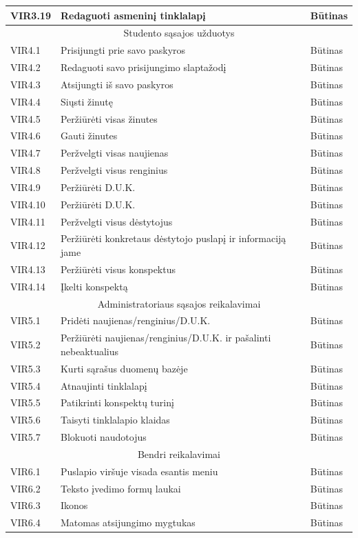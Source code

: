 \documentclass{VUMIFPSkursinis}
\begin{document}
\begin{longtable}{|p{2cm}|p{}|p{2cm}|}
{VIR3.19}&{Redaguoti asmeninį tinklalapį}&{Būtinas}\\ 	\hline
\multicolumn{3}{|c|}{Studento sąsajos užduotys}\\	\hline
{VIR4.1}&{Prisijungti prie savo paskyros}&{Būtinas}\\	\hline
{VIR4.2}&{Redaguoti savo prisijungimo slaptažodį}&{Būtinas}\\	\hline
{VIR4.3}&{Atsijungti iš savo paskyros}&{Būtinas}\\	\hline
{VIR4.4}&{Siųsti žinutę}&{Būtinas}\\	\hline
{VIR4.5}&{Peržiūrėti visas žinutes}&{Būtinas}\\	\hline
{VIR4.6}&{Gauti žinutes}&{Būtinas}\\	\hline
{VIR4.7}&{Peržvelgti visas naujienas}&{Būtinas}\\	\hline
{VIR4.8}&{Peržvelgti visus renginius}&{Būtinas}\\	\hline
{VIR4.9}&{Peržiūrėti D.U.K.}&{Būtinas}\\	\hline
{VIR4.10}&{Peržiūrėti D.U.K.}&{Būtinas}\\	\hline
{VIR4.11}&{Peržvelgti visus dėstytojus}&{Būtinas}\\	\hline
{VIR4.12}&{Peržiūrėti konkretaus dėstytojo puslapį ir informaciją jame}&{Būtinas}\\	\hline
{VIR4.13}&{Peržiūrėti visus konspektus}&{Būtinas}\\	\hline
{VIR4.14}&{Įkelti konspektą}&{Būtinas}\\	\hline
\multicolumn{3}{|c|}{Administratoriaus sąsajos reikalavimai}\\	\hline
{VIR5.1}&{Pridėti naujienas/renginius/D.U.K.}&{Būtinas}\\	\hline
{VIR5.2}&{Peržiūrėti naujienas/renginius/D.U.K. ir pašalinti nebeaktualius}&{Būtinas}\\	\hline
{VIR5.3}&{Kurti sąrašus duomenų bazėje}&{Būtinas}\\	\hline
{VIR5.4}&{Atnaujinti tinklalapį}&{Būtinas}\\	\hline
{VIR5.5}&{Patikrinti konspektų turinį}&{Būtinas}\\	\hline
{VIR5.6}&{Taisyti tinklalapio klaidas}&{Būtinas}\\	\hline
{VIR5.7}&{Blokuoti naudotojus}&{Būtinas}\\	\hline
\multicolumn{3}{|c|}{Bendri reikalavimai}\\	\hline
{VIR6.1}&{Puslapio viršuje visada esantis meniu}&{Būtinas}\\	\hline
{VIR6.2}&{Teksto įvedimo formų laukai}&{Būtinas}\\	\hline
{VIR6.3}&{Ikonos}&{Būtinas}\\	\hline
{VIR6.4}&{Matomas atsijungimo mygtukas}&{Būtinas}\\	\hline
\end{longtable}
\end{document}
